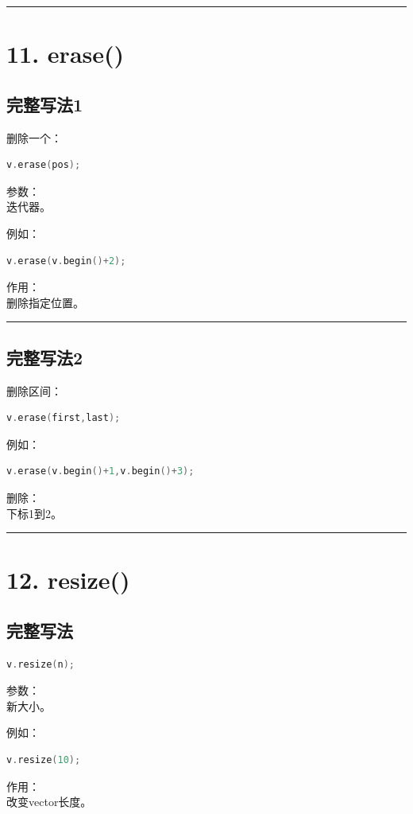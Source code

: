 \documentclass[9pt,twocolumn]{extarticle}
\begin{document}
\noindent\rule{\linewidth}{0.4pt}

\section{11. erase()}

\subsection{完整写法1}
删除一个：
\begin{lstlisting}[language=C++]
v.erase(pos);
\end{lstlisting}
参数：\\
迭代器。

例如：
\begin{lstlisting}[language=C++]
v.erase(v.begin()+2);
\end{lstlisting}
作用：\\
删除指定位置。

\noindent\rule{\linewidth}{0.4pt}

\subsection{完整写法2}
删除区间：
\begin{lstlisting}[language=C++]
v.erase(first,last);
\end{lstlisting}
例如：
\begin{lstlisting}[language=C++]
v.erase(v.begin()+1,v.begin()+3);
\end{lstlisting}
删除：\\
下标1到2。

\noindent\rule{\linewidth}{0.4pt}

\section{12. resize()}

\subsection{完整写法}
\begin{lstlisting}[language=C++]
v.resize(n);
\end{lstlisting}
参数：\\
新大小。

例如：
\begin{lstlisting}[language=C++]
v.resize(10);
\end{lstlisting}
作用：\\
改变vector长度。
\end{document}
